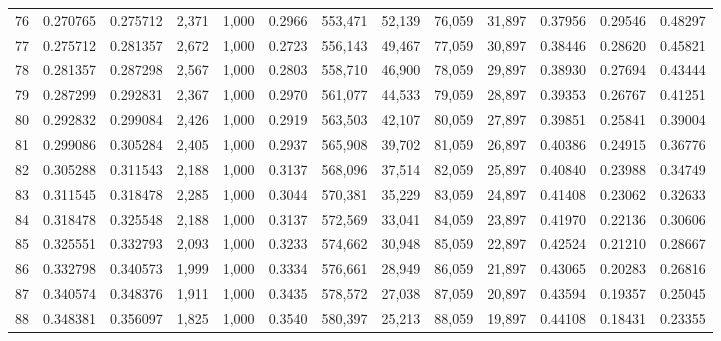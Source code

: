 \begin{tabular}{rrrrrrrrrrrrr}
76  &  0.270765 &  0.275712 &   2,371 &  1,000 &                                     0.2966 &  553,471 &   52,139 &   76,059 &   31,897 &  0.37956 &  0.29546 &  0.48297 \\
77  &  0.275712 &  0.281357 &   2,672 &  1,000 &                                     0.2723 &  556,143 &   49,467 &   77,059 &   30,897 &  0.38446 &  0.28620 &  0.45821 \\
78  &  0.281357 &  0.287298 &   2,567 &  1,000 &                                     0.2803 &  558,710 &   46,900 &   78,059 &   29,897 &  0.38930 &  0.27694 &  0.43444 \\
79  &  0.287299 &  0.292831 &   2,367 &  1,000 &                                     0.2970 &  561,077 &   44,533 &   79,059 &   28,897 &  0.39353 &  0.26767 &  0.41251 \\
80  &  0.292832 &  0.299084 &   2,426 &  1,000 &                                     0.2919 &  563,503 &   42,107 &   80,059 &   27,897 &  0.39851 &  0.25841 &  0.39004 \\
81  &  0.299086 &  0.305284 &   2,405 &  1,000 &                                     0.2937 &  565,908 &   39,702 &   81,059 &   26,897 &  0.40386 &  0.24915 &  0.36776 \\
82  &  0.305288 &  0.311543 &   2,188 &  1,000 &                                     0.3137 &  568,096 &   37,514 &   82,059 &   25,897 &  0.40840 &  0.23988 &  0.34749 \\
83  &  0.311545 &  0.318478 &   2,285 &  1,000 &                                     0.3044 &  570,381 &   35,229 &   83,059 &   24,897 &  0.41408 &  0.23062 &  0.32633 \\
84  &  0.318478 &  0.325548 &   2,188 &  1,000 &                                     0.3137 &  572,569 &   33,041 &   84,059 &   23,897 &  0.41970 &  0.22136 &  0.30606 \\
85  &  0.325551 &  0.332793 &   2,093 &  1,000 &                                     0.3233 &  574,662 &   30,948 &   85,059 &   22,897 &  0.42524 &  0.21210 &  0.28667 \\
86  &  0.332798 &  0.340573 &   1,999 &  1,000 &                                     0.3334 &  576,661 &   28,949 &   86,059 &   21,897 &  0.43065 &  0.20283 &  0.26816 \\
87  &  0.340574 &  0.348376 &   1,911 &  1,000 &                                     0.3435 &  578,572 &   27,038 &   87,059 &   20,897 &  0.43594 &  0.19357 &  0.25045 \\
88  &  0.348381 &  0.356097 &   1,825 &  1,000 &                                     0.3540 &  580,397 &   25,213 &   88,059 &   19,897 &  0.44108 &  0.18431 &  0.23355 \\

\end{tabular}
